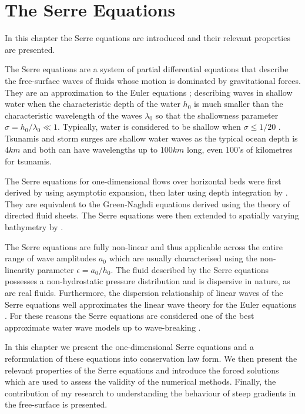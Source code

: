 
\chapter{The Serre Equations}
\label{chp:Serreeqns}
In this chapter the Serre equations are introduced and their relevant properties are presented.

The Serre equations are a system of partial differential equations that describe the free-surface waves of fluids whose motion is dominated by gravitational forces. They are an approximation to the Euler equations \cite{Euler-1755-274}; describing waves in shallow water when the characteristic depth of the water $h_0$ is much smaller than the characteristic wavelength of the waves $\lambda_0$ so that the shallowness parameter $ \sigma = h_0 / \lambda_0  \ll 1 $. Typically, water is considered to be shallow when $\sigma  \le  1/ 20$ \cite{Sorenson-2006}. Tsunamis and storm surges are shallow water waves as the typical ocean depth is $4km$ and both can have wavelengths up to $100km$ long, even $100$'s of kilometres for tsunamis.

The Serre equations for one-dimensional flows over horizontal beds were first derived by \citet{Serre-F-1953-857} using asymptotic expansion, then later using depth integration by \citet{Su-Gardener-1969-536}. They are equivalent to the Green-Naghdi equations \cite{Green-Naghdi-1976-237} derived using the theory of directed fluid sheets. The Serre equations were then extended to spatially varying bathymetry by \citet{Seabra-Santos-etal-1987-117}. 

The Serre equations are fully non-linear and thus applicable across the entire range of wave amplitudes $a_0$ which are usually characterised using the non-linearity parameter $\epsilon = a_0 / h_0$. The fluid described by the Serre equations possesses a non-hydrostatic pressure distribution and is dispersive in nature, as are real fluids. Furthermore, the dispersion relationship of linear waves of the Serre equations well approximates the linear wave theory for the Euler equations \cite{Barthelemy-2004-315}. For these reasons the Serre equations are considered one of the best approximate water wave models up to wave-breaking \cite{Bonneton-Lannes-2009-16601,Bonneton-etal-2011-1479}. 

In this chapter we present the one-dimensional Serre equations and a reformulation of these equations into conservation law form. We then present the relevant properties of the Serre equations and introduce the forced solutions which are used to assess the validity of the numerical methods. Finally, the contribution of my research to understanding the behaviour of steep gradients in the free-surface is presented. 

